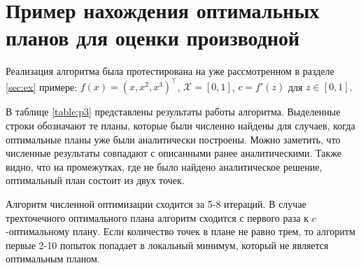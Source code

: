 \documentclass[specialist,
               substylefile = spbu.rtx,
               subf,href,colorlinks=true, 12pt]{disser}
\theoremstyle{definition}
\begin{document}
	\section{Пример нахождения оптимальных планов для оценки производной}
	Реализация алгоритма была протестирована на уже рассмотренном в разделе \ref{sec:ex} примере: $f(x) = (x, x^2, x^3)^\top$, $\mathcal{X} = [0, 1]$, $c = f'(z)$ для $z \in [0, 1]$.
	
	В таблице \ref{table:p3} представлены результаты работы алгоритма. Выделенные строки обозначают те планы, которые были численно найдены для случаев, когда оптимальные планы уже были аналитически построены. Можно заметить, что численные результаты совпадают с описанными ранее аналитическими. Также видно, что на промежутках, где не было найдено аналитическое решение, оптимальный план состоит из двух точек.
	
	Алгоритм численной оптимизации сходится за 5-8 итераций. В случае трехточечного оптимального плана алгоритм сходится с первого раза к $c$-оптимальному плану. Если  количество точек в плане не равно трем, то алгоритм первые 2-10 попыток попадает в локальный минимум, который не является оптимальным планом.
	
\end{document}

